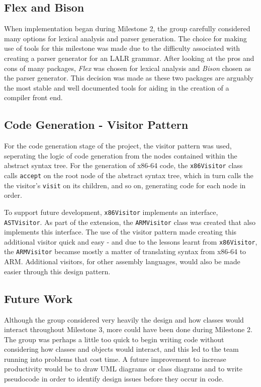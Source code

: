 \documentclass[a4wide, 11pt]{article}
\begin{document}
\newpage

\subsection{Flex and Bison}

When implementation began during Milestone 2, the group carefully considered
many options for lexical analysis and parser generation. The choice for making 
use of tools for this milestone was made due to the difficulty associated with
creating a parser generator for an LALR grammar. After looking at the
pros and cons of many packages, \emph{Flex} was chosen for lexical analysis
and \emph{Bison} chosen as the parser generator. This decision was made as 
these two packages are arguably the most stable and well documented tools for 
aiding in the creation of a compiler front end.

\subsection{Code Generation - Visitor Pattern}

For the code generation stage of the project, the visitor pattern was used, 
seperating the logic of code generation from the nodes contained within the
abstract syntax tree. For the generation of x86-64 code, the \texttt{x86Visitor}
class calls \texttt{accept} on the root node of the abstract syntax tree, which
in turn calls the the visitor's \texttt{visit} on its children, and so on, 
generating code for each node in order. 

To support future development, \texttt{x86Visitor} implements an interface,
\texttt{ASTVisitor}. As part of the extension, the \texttt{ARMVisitor} class was
created that also implements this interface. The use of the visitor pattern
made creating this additional visitor quick and easy - and due to the lessons
learnt from \texttt{x86Visitor}, the \texttt{ARMVisitor} becamse mostly a
matter of translating syntax from x86-64 to ARM. Additional visitors, for other
assembly languages, would also be made easier through this design pattern.

\subsection{Future Work}

Although the group considered very heavily the design and how classes would
interact throughout Milestone 3, more could have been done during Milestone 2.
The group was perhaps a little too quick to begin writing code without 
considering how classes and objects would interact, and this led to the team 
running into problems that cost time. A future improvement to increase 
productivity would be to draw UML diagrams or class diagrams and to write
pseudocode in order to identify design issues before they occur in code.
\end{document}
